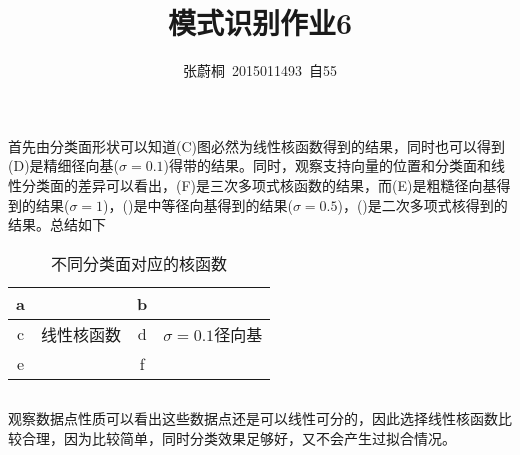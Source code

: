 \documentclass[UTF8,a4paper]{ctexart}
\title{模式识别作业6}
\author{张蔚桐\ 2015011493\ 自55}
\begin{document}
\maketitle
\section{}
\subsection{}
首先由分类面形状可以知道(C)图必然为线性核函数得到的结果，同时也可以得到(D)是精细径向基($\sigma=0.1$)得带的结果。同时，观察支持向量的位置和分类面和线性分类面的差异可以看出，(F)是三次多项式核函数的结果，而(E)是粗糙径向基得到的结果($\sigma=1$)，()是中等径向基得到的结果($\sigma=0.5$)，()是二次多项式核得到的结果。总结如下

\begin{table}
\caption{不同分类面对应的核函数}
\centering
\begin{tabular}{|c|c|c|c|}
\hline
a &  & b & \\
\hline
c &线性核函数& d &$\sigma=0.1$径向基\\
\hline
e &  & f & \\
\hline
\end{tabular}
\end{table}
\subsection{}
观察数据点性质可以看出这些数据点还是可以线性可分的，因此选择线性核函数比较合理，因为比较简单，同时分类效果足够好，又不会产生过拟合情况。
\section{}
\end{document}

